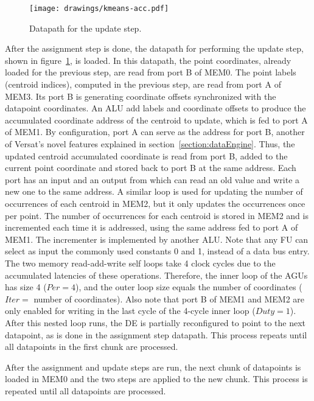 \begin{figure}[!htb]
\centering \texttt{[image: drawings/kmeans-acc.pdf]}
\caption{Datapath for the update step.}
\label{fig:update}
\end{figure}

After the assignment step is done, the datapath for performing the
update step, shown in figure~\ref{fig:update}, is loaded. In this
datapath, the point coordinates, already loaded for the previous step,
are read from port B of MEM0. The point labels (centroid indices),
computed in the previous step, are read from port A of MEM3. Its port
B is generating coordinate offsets synchronized with the datapoint
coordinates. An ALU add labels and coordinate offsets to produce the
accumulated coordinate address of the centroid to update, which is fed
to port A of MEM1. By configuration, port A can serve as the address
for port B, another of Versat's novel features explained in
section~\ref{section:dataEngine}. Thus, the updated centroid
accumulated coordinate is read from port B, added to the current point
coordinate and stored back to port B at the same address. Each port
has an input and an output from which can read an old value and write
a new one to the same address. A similar loop is used for updating the
number of occurrences of each centroid in MEM2, but it only updates
the occurrences once per point. The number of occurrences for each
centroid is stored in MEM2 and is incremented each time it is
addressed, using the same address fed to port A of MEM1. The
incrementer is implemented by another ALU. Note that any FU can select
as input the commonly used constants 0 and 1, instead of a data bus
entry. The two memory read-add-write self loops take 4 clock cycles
due to the accumulated latencies of these operations. Therefore, the
inner loop of the AGUs has size 4 ($Per=4$), and the outer loop size
equals the number of coordinates ($Iter=$ number of coordinates). Also
note that port B of MEM1 and MEM2 are only enabled for writing in the
last cycle of the 4-cycle inner loop ($Duty=1$). After this nested
loop runs, the DE is partially reconfigured to point to the next
datapoint, as is done in the assignment step datapath. This process
repeats until all datapoints in the first chunk are processed.

After the assignment and update steps are run, the next chunk of
datapoints is loaded in MEM0 and the two steps are applied to the new
chunk. This process is repeated until all datapoints are processed.

